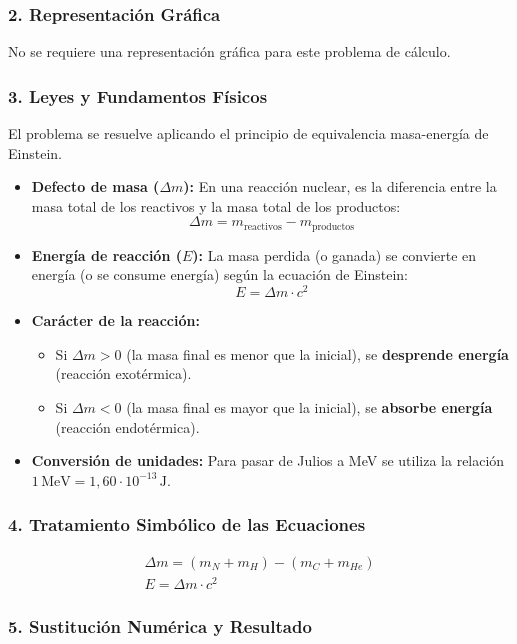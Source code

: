 \subsubsection*{2. Representación Gráfica}
No se requiere una representación gráfica para este problema de cálculo.

\subsubsection*{3. Leyes y Fundamentos Físicos}
El problema se resuelve aplicando el principio de equivalencia masa-energía de Einstein.
\begin{itemize}
    \item \textbf{Defecto de masa ($\Delta m$):} En una reacción nuclear, es la diferencia entre la masa total de los reactivos y la masa total de los productos:
    $$\Delta m = m_{\text{reactivos}} - m_{\text{productos}}$$
    \item \textbf{Energía de reacción ($E$):} La masa perdida (o ganada) se convierte en energía (o se consume energía) según la ecuación de Einstein:
    $$E = \Delta m \cdot c^2$$
    \item \textbf{Carácter de la reacción:}
        \begin{itemize}
            \item Si $\Delta m > 0$ (la masa final es menor que la inicial), se \textbf{desprende energía} (reacción exotérmica).
            \item Si $\Delta m < 0$ (la masa final es mayor que la inicial), se \textbf{absorbe energía} (reacción endotérmica).
        \end{itemize}
    \item \textbf{Conversión de unidades:} Para pasar de Julios a MeV se utiliza la relación $1\,\text{MeV} = 1,60 \cdot 10^{-13}\,\text{J}$.
\end{itemize}

\subsubsection*{4. Tratamiento Simbólico de las Ecuaciones}
\begin{gather}
    \Delta m = (m_N + m_H) - (m_C + m_{He}) \\
    E = \Delta m \cdot c^2
\end{gather}

\subsubsection*{5. Sustitución Numérica y Resultado}
